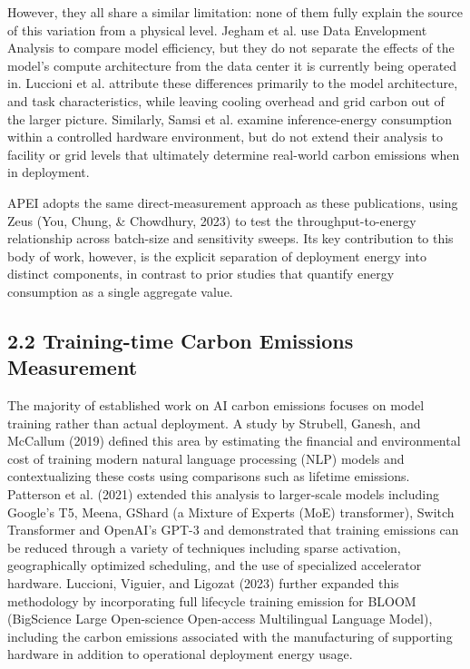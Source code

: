 \documentclass[11pt]{article}
\begin{document}
However, they all share a similar limitation: none of them fully explain the source of this variation from a physical level. Jegham et al. use Data Envelopment Analysis to compare model efficiency, but they do not separate the effects of the model's compute architecture from the data center it is currently being operated in. Luccioni et al. attribute these differences primarily to the model architecture, and task characteristics, while leaving cooling overhead and grid carbon out of the larger picture. Similarly, Samsi et al. examine inference-energy consumption within a controlled hardware environment, but do not extend their analysis to facility or grid levels that ultimately determine real-world carbon emissions when in deployment.

APEI adopts the same direct-measurement approach as these publications, using Zeus (You, Chung, \& Chowdhury, 2023) to test the throughput-to-energy relationship across batch-size and sensitivity sweeps. Its key contribution to this body of work, however, is the explicit separation of deployment energy into distinct components, in contrast to prior studies that quantify energy consumption as a single aggregate value.

\subsection*{2.2 Training-time Carbon Emissions Measurement}

The majority of established work on AI carbon emissions focuses on model training rather than actual deployment. A study by Strubell, Ganesh, and McCallum (2019) defined this area by estimating the financial and environmental cost of training modern natural language processing (NLP) models and contextualizing these costs using comparisons such as lifetime emissions. Patterson et al. (2021) extended this analysis to larger-scale models including Google's T5, Meena, GShard (a Mixture of Experts (MoE) transformer), Switch Transformer and OpenAI's GPT-3 and demonstrated that training emissions can be reduced through a variety of techniques including sparse activation, geographically optimized scheduling, and the use of specialized accelerator hardware. Luccioni, Viguier, and Ligozat (2023) further expanded this methodology by incorporating full lifecycle training emission for BLOOM (BigScience Large Open-science Open-access Multilingual Language Model), including the carbon emissions associated with the manufacturing of supporting hardware in addition to operational deployment energy usage.
\end{document}
